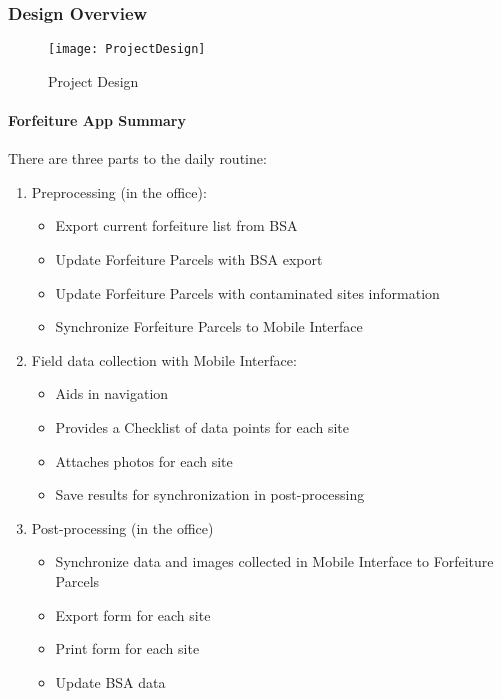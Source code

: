\subsubsection{Design Overview}
\vspace{-.2in}

\begin{figure}[h!]
\centering
    \texttt{[image: ProjectDesign]}
\vspace{-.2in}

\caption{Project Design}
\end{figure}
\clearpage
\paragraph{Forfeiture App Summary}
\vspace{.25in}

There are three parts to the daily routine:
\begin{enumerate}
\item \Large Preprocessing \normalsize(in the office):
\begin{itemize}
\item Export current forfeiture list from BSA
\item Update Forfeiture Parcels with BSA export
\item Update Forfeiture Parcels with contaminated sites information
\item Synchronize Forfeiture Parcels to Mobile Interface
\end{itemize}
\item \Large Field data collection \normalsize with Mobile Interface:
\begin{itemize}
\item Aids in navigation
\item Provides a Checklist of data points for each site
\item Attaches photos for each site
\item Save results for synchronization in post-processing
\end{itemize}
\item \Large Post-processing \normalsize (in the office)
\begin{itemize}
\item Synchronize data and images collected in Mobile Interface to Forfeiture Parcels
\item Export form for each site
\item Print form for each site
\item Update BSA data
\end{itemize}
\end{enumerate}
\clearpage
